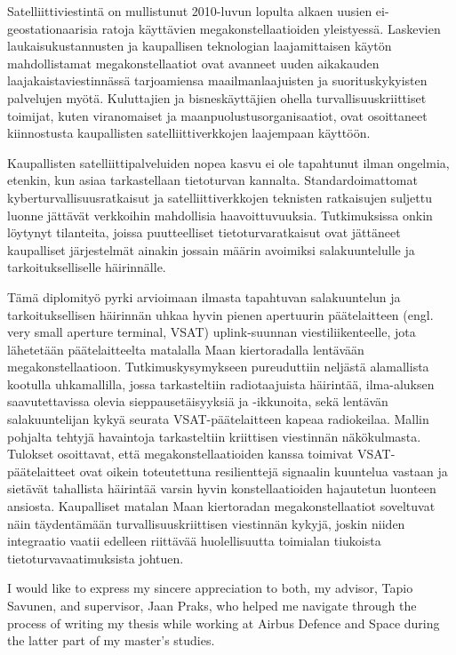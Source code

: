 \documentclass[english, 12pt, a4paper, elec, utf8, a-1b, online]{aaltothesis}
\begin{document}
\begin{abstractpage}[finnish]
  Satelliittiviestintä on mullistunut 2010-luvun lopulta alkaen uusien ei-geostationaarisia ratoja käyttävien megakonstellaatioiden yleistyessä. Laskevien laukaisukustannusten ja kaupallisen teknologian laajamittaisen käytön mahdollistamat megakonstellaatiot ovat avanneet uuden aikakauden laajakaistaviestinnässä tarjoamiensa maailmanlaajuisten ja suorituskykyisten palvelujen myötä. Kuluttajien ja bisneskäyttäjien ohella turvallisuuskriittiset toimijat, kuten viranomaiset ja maanpuolustusorganisaatiot, ovat osoittaneet kiinnostusta kaupallisten satelliittiverkkojen laajempaan käyttöön.

  Kaupallisten satelliittipalveluiden nopea kasvu ei ole tapahtunut ilman ongelmia, etenkin, kun asiaa tarkastellaan tietoturvan kannalta. Standardoimattomat kyberturvallisuusratkaisut ja satelliittiverkkojen teknisten ratkaisujen suljettu luonne jättävät verkkoihin mahdollisia haavoittuvuuksia.
  Tutkimuksissa onkin löytynyt tilanteita, joissa puutteelliset tietoturvaratkaisut ovat jättäneet kaupalliset järjestelmät ainakin jossain määrin avoimiksi salakuuntelulle ja tarkoitukselliselle häirinnälle.
  
  Tämä diplomityö pyrki arvioimaan ilmasta tapahtuvan salakuuntelun ja tarkoituksellisen häirinnän uhkaa hyvin pienen apertuurin päätelaitteen (engl. very small aperture terminal, VSAT) uplink-suunnan viestiliikenteelle, jota lähetetään päätelaitteelta matalalla Maan kiertoradalla lentävään megakonstellaatioon. Tutkimuskysymykseen pureuduttiin neljästä alamallista kootulla uhkamallilla, jossa tarkasteltiin radiotaajuista häirintää, ilma-aluksen saavutettavissa olevia sieppausetäisyyksiä ja -ikkunoita, sekä lentävän salakuuntelijan kykyä seurata VSAT-päätelaitteen kapeaa radiokeilaa. Mallin pohjalta tehtyjä havaintoja tarkasteltiin kriittisen viestinnän näkökulmasta. Tulokset osoittavat, että megakonstellaatioiden kanssa toimivat VSAT-päätelaitteet ovat oikein toteutettuna resilienttejä signaalin kuuntelua vastaan ja sietävät tahallista häirintää varsin hyvin konstellaatioiden hajautetun luonteen ansiosta. Kaupalliset matalan Maan kiertoradan megakonstellaatiot soveltuvat näin täydentämään turvallisuuskriittisen viestinnän kykyjä, joskin niiden integraatio vaatii edelleen riittävää huolellisuutta toimialan tiukoista tietoturvavaatimuksista johtuen.
\end{abstractpage}


I would like to express my sincere appreciation to both, my advisor, Tapio Savunen, and supervisor, Jaan Praks, who helped me navigate through the process of writing my thesis while working at Airbus Defence and Space during the latter part of my master's studies.
\end{document}
